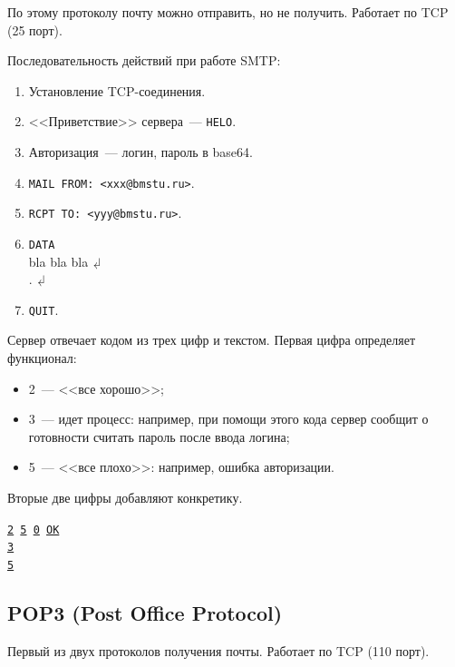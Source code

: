 По этому протоколу почту можно отправить, но не получить. Работает по TCP (25 порт).

Последовательность действий при работе SMTP:

\begin{enumerate}
    \item Установление TCP-соединения.
    \item <<Приветствие>> сервера~--- \texttt{HELO}.
    \item Авторизация~--- логин, пароль в base64.
    \item \texttt{MAIL FROM: <xxx@bmstu.ru>}.
    \item \texttt{RCPT TO: <yyy@bmstu.ru>}.
    \item \texttt{DATA}\\
          bla bla bla$\dlsh$\\
          .$\dlsh$
    \item \texttt{QUIT}.
\end{enumerate}

Сервер отвечает кодом из трех цифр и текстом. Первая цифра определяет функционал:

\begin{itemize}
    \item 2~--- <<все хорошо>>;
    \item 3~--- идет процесс: например, при помощи этого кода сервер сообщит о готовности считать пароль после ввода логина;
    \item 5~--- <<все плохо>>: например, ошибка авторизации.
\end{itemize}

Вторые две цифры добавляют конкретику.

\begin{center}
    \texttt{\underline{2}\,\underline{5}\,\underline{0} \underline{OK}}\\
    \texttt{\underline{3}\,\underline{\phantom{5}}\,\underline{\phantom{5}} \underline{\phantom{OK}}}\\
    \texttt{\underline{5}\,\underline{\phantom{5}}\,\underline{\phantom{5}} \underline{\phantom{OK}}}
\end{center}

\subsection{POP3 (Post Office Protocol)}

Первый из двух протоколов получения почты. Работает по TCP (110 порт).

